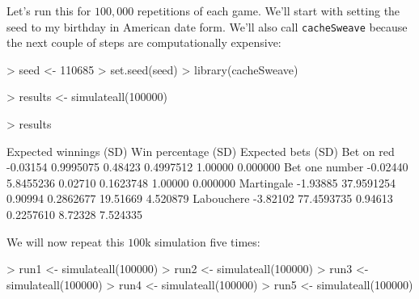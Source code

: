 \documentclass[10pt, oneside, reqno]{article}
\theoremstyle{plain}
\begin{document}
Let's run this for $100,000$ repetitions of each game. We'll start with setting the seed to my birthday in American date form. We'll also call {\tt cacheSweave} because the next couple of steps are computationally expensive:

\begin{Schunk}
\begin{Sinput}
> seed <- 110685
> set.seed(seed)
> library(cacheSweave)
\end{Sinput}
\end{Schunk}

\begin{Schunk}
\begin{Sinput}
> results <- simulateall(100000)
\end{Sinput}
\end{Schunk}

\begin{Schunk}
\begin{Sinput}
> results
\end{Sinput}
\begin{Soutput}
               Expected winnings       (SD) Win percentage      (SD) Expected bets     (SD)
Bet on red              -0.03154  0.9995075        0.48423 0.4997512       1.00000 0.000000
Bet one number          -0.02440  5.8455236        0.02710 0.1623748       1.00000 0.000000
Martingale              -1.93885 37.9591254        0.90994 0.2862677      19.51669 4.520879
Labouchere              -3.82102 77.4593735        0.94613 0.2257610       8.72328 7.524335
\end{Soutput}
\end{Schunk}

We will now repeat this $100$k simulation five times:

\begin{Schunk}
\begin{Sinput}
> run1 <- simulateall(100000)
> run2 <- simulateall(100000)
> run3 <- simulateall(100000)
> run4 <- simulateall(100000)
> run5 <- simulateall(100000)
\end{Sinput}
\end{Schunk}
\end{document}
